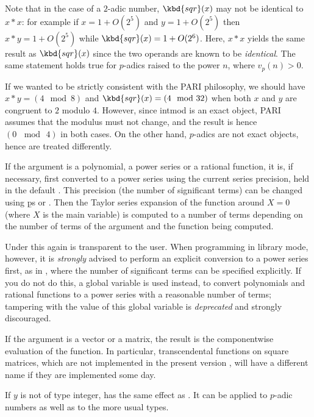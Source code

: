 Note that in the case of a $2$-adic number, $\kbd{sqr}(x)$ may not be
identical to $x*x$: for example if $x = 1+O(2^5)$ and $y = 1+O(2^5)$ then
$x*y = 1+O(2^5)$ while $\kbd{sqr}(x) = 1+O(2^6)$. Here, $x * x$ yields the
same result as $\kbd{sqr}(x)$ since the two operands are known to be
\emph{identical}. The same statement holds true for $p$-adics raised to the
power $n$, where $v_p(n) > 0$.

 If we wanted to be strictly consistent with
the PARI philosophy, we should have $x*y = (4 \mod 8)$ and $\kbd{sqr}(x) =
(4 \mod 32)$ when both $x$ and $y$ are congruent to $2$ modulo $4$.
However, since intmod is an exact object, PARI assumes that the modulus
must not change, and the result is hence $(0\, \mod\, 4)$ in both cases. On
the other hand, $p$-adics are not exact objects, hence are treated
differently.

\item If the argument is a polynomial, a power series or a rational function,
it is, if necessary, first converted to a power series using the current
series precision, held in the default . This precision
(the number of significant terms) can be changed using \b{ps} or
. Then the Taylor series expansion of the
function around $X=0$ (where $X$ is the main variable) is computed to a
number of terms depending on the number of terms of the argument and the
function being computed.

Under  this again is transparent to the user. When programming in
library mode, however, it is \emph{strongly} advised to perform an explicit
conversion to a power series first, as in ,
where the number of significant terms  can be specified
explicitly. If you do not do this, a global variable  is used
instead, to convert polynomials and rational functions to a power series with
a reasonable number of terms; tampering with the value of this global
variable is \emph{deprecated} and strongly discouraged.


\item If the argument is a vector or a matrix, the result is the
componentwise evaluation of the function. In particular, transcendental
functions on square matrices, which are not implemented in the present
version \vers, will have a different name if they are implemented some day.

\subseckbd{\pow} If $y$ is not of type integer,  has the same
effect as . It can be applied to $p$-adic numbers as well
as to the more usual types.

